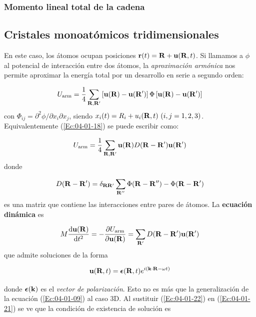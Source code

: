 \subsubsection{Momento lineal total de la cadena}


\subsection{Cristales monoatómicos tridimensionales}

En este caso, los átomos ocupan posiciones $\mathbf{r}(t) = \mathbf{R} + \mathbf{u} (\mathbf{R},t)$. Si llamamos a $\phi$ al potencial de interacción entre dos átomos, la \textit{aproximación armónica} nos permite aproximar la energía total por un desarrollo en serie a segundo orden:

\begin{equation}
	U_{\text{arm}} = \frac{1}{4} \sum_{\mathbf{R},\mathbf{R}'} \left[ \mathbf{u}(\mathbf{R})-\mathbf{u}(\mathbf{R}') \right] \Phi \left[ \mathbf{u}(\mathbf{R})-\mathbf{u}(\mathbf{R}') \right] \label{Ec:04-01-18}
\end{equation}
con $\Phi_{ij}=\partial^2 \phi / \partial x_i \partial x_j$, siendo $x_i(t) = R_i + u_i (\Rn,t) \ (i,j=1,2,3)$. Equivalentemente (\ref{Ec:04-01-18}) se puede escribir como:

\begin{equation}
	U_{\text{arm}} = \frac{1}{4} \sum_{\mathbf{R},\mathbf{R}'}\mathbf{u}(\mathbf{R}) D(\mathbf{R}-\mathbf{R}' ) \mathbf{u}(\mathbf{R}') \label{Ec:04-01-13}
\end{equation}
donde 

\begin{equation}
	 D(\mathbf{R}-\mathbf{R}' ) = \delta_{\mathbf{R} \mathbf{R}'} \sum_{\mathbf{R}''} \Phi (\mathbf{R}- \mathbf{R}'') - \Phi (\mathbf{R} - \mathbf{R}')
\end{equation}
es una matriz que contiene las interacciones entre pares de átomos. La {\bf ecuación dinámica} es

\begin{equation}
 	M \frac{\mathrm{d} \mathbf{u} (\mathbf{R})}{\mathrm{d} t^2} =  - \frac{\partial U_\text{arm}}{\partial \mathbf{u} (\mathbf{R})} = \sum_{\mathbf{R}'} D (\mathbf{R}-\mathbf{R}') \mathbf{u} (\mathbf{R}') \label{Ec:04-01-21}
\end{equation}
que admite soluciones de la forma

\begin{mybox}
\begin{equation}
	\mathbf{u} (\mathbf{R},t) = \boldsymbol{\epsilon} (\mathbf{R},t) e^{i(\mathbf{k} \cdot \mathbf{R} - \omega t)}  \label{Ec:04-01-22}
\end{equation}
\end{mybox}
donde $\boldsymbol{\epsilon}(\mathbf{k})$ es el \textit{vector de polarización}. Esto no es más que la generalización de la ecuación (\ref{Ec:04-01-09}) al caso 3D. Al sustituir  (\ref{Ec:04-01-22}) en (\ref{Ec:04-01-21}) se ve que la condición de existencia de solución es 

